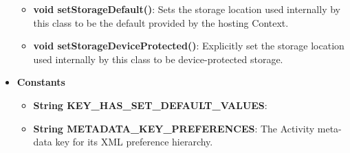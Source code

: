 \documentclass{report}
\begin{document}
\begin{itemize}
\begin{itemize}
                \item \textbf{void	setStorageDefault()}: Sets the storage location used internally by this class to be the default provided by the hosting Context.
                \item \textbf{void	setStorageDeviceProtected()}: Explicitly set the storage location used internally by this class to be device-protected storage.
            \end{itemize}
        \item \textbf{Constants}
            \begin{itemize}
                \item \textbf{String	KEY\_HAS\_SET\_DEFAULT\_VALUES}:
                \item \textbf{String	METADATA\_KEY\_PREFERENCES}: The Activity meta-data key for its XML preference hierarchy.
            \end{itemize}

    \end{itemize}

    \pagebreak 
\end{document}
